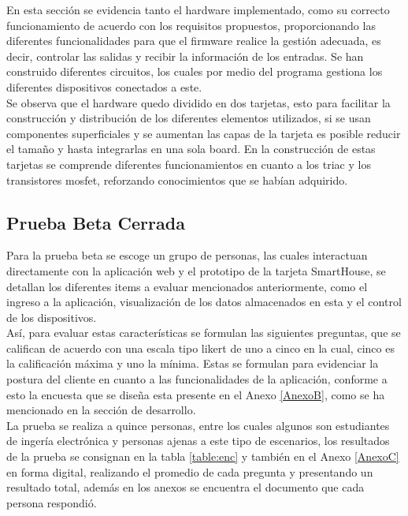 En esta sección se evidencia tanto el hardware implementado, como su correcto funcionamiento de acuerdo con los requisitos propuestos, proporcionando las diferentes funcionalidades para que el firmware realice la gestión adecuada, es decir, controlar las salidas y recibir la información de los entradas. Se han construido diferentes circuitos, los cuales por medio del programa gestiona los diferentes dispositivos conectados a este.\\

Se observa que el hardware quedo dividido en dos tarjetas, esto para facilitar la construcción y distribución de los diferentes elementos utilizados, si se usan componentes superficiales y se aumentan las capas de la tarjeta es posible reducir el tamaño y hasta integrarlas en una sola board. En la construcción de estas tarjetas se comprende diferentes funcionamientos en cuanto a los triac y los transistores mosfet, reforzando conocimientos que se habían adquirido.\\

\subsection{Prueba Beta Cerrada}

Para la prueba beta se escoge un grupo de personas, las cuales interactuan directamente con la aplicación web y el prototipo de la tarjeta SmartHouse, se detallan los diferentes items a evaluar mencionados anteriormente, como el ingreso a la aplicación, visualización de los datos almacenados en esta y el control de los dispositivos.\\

Así, para evaluar estas características se formulan las siguientes preguntas, que se califican de acuerdo con una escala tipo likert \cite{lik} de uno a cinco en la cual, cinco es la calificación máxima y uno la mínima. Estas se formulan para evidenciar la postura del cliente en cuanto a las funcionalidades de la aplicación, conforme a esto la encuesta que se diseña esta presente en el Anexo \ref{AnexoB}, como se ha mencionado en la sección de desarrollo.\\

La prueba se realiza a quince personas, entre los cuales algunos son estudiantes de ingería electrónica y personas ajenas a este tipo de escenarios, los resultados de la prueba se consignan en la tabla \ref{table:enc} y también en el Anexo \ref{AnexoC} en forma digital, realizando el promedio de cada pregunta y presentando un resultado total, además en los anexos se encuentra el documento que cada persona respondió.\\

